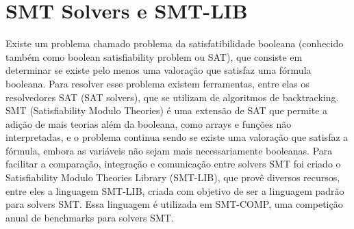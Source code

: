 \section{SMT Solvers e SMT-LIB}\label{sec:LABEL_CHP_2_SEC_B}
Existe um problema chamado problema da satisfatibilidade booleana (conhecido também como boolean satisfiability problem ou SAT), que consiste em determinar se existe pelo menos uma valoração que satisfaz uma fórmula booleana. Para resolver esse problema existem ferramentas, entre elas os resolvedores SAT (SAT solvers), que se utilizam de algoritmos de backtracking. SMT (Satisfiability Modulo Theories) é uma extensão de SAT que permite a adição de mais teorias além da booleana, como arrays e funções não interpretadas, e o problema continua sendo se existe uma valoração que satisfaz a fórmula, embora as variáveis não sejam mais necessariamente booleanas. Para facilitar a comparação, integração e comunicação entre solvers SMT foi criado o Satisfiability Modulo Theories Library (SMT-LIB), que provê diversos recursos, entre eles a linguagem SMT-LIB, criada com objetivo de ser a linguagem padrão para solvers SMT. Essa linguagem é utilizada em SMT-COMP, uma competição anual de benchmarks para solvers SMT.\\

\\
